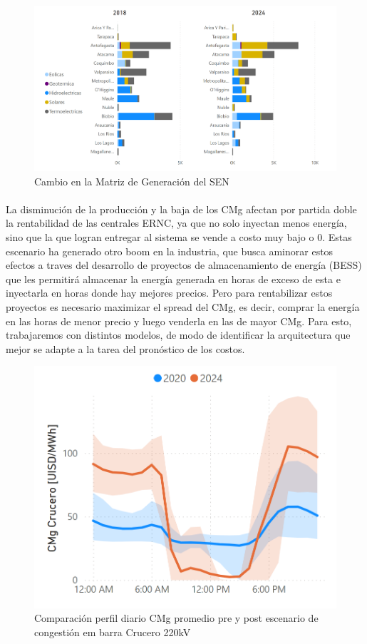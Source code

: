\documentclass[twocolumn]{article}
\begin{document}
\begin{figure}[htbp]
    \centering
    \includegraphics[width=1\columnwidth]{matriz_sist.png}
    \caption{Cambio en la Matriz de Generación del SEN}
    \label{fig:matriz_sistema}
\end{figure}

\paragraph{}
La disminución de la producción y la baja de los CMg afectan por partida doble la rentabilidad de las centrales ERNC, ya que
no solo inyectan menos energía, sino que la que logran entregar al sistema se vende a costo muy bajo o 0.
Estas escenario ha generado otro boom en la industria, que busca aminorar estos efectos a traves del desarrollo de 
proyectos de almacenamiento de energía (BESS) que les permitirá almacenar la energía generada en horas de exceso de esta 
e inyectarla en horas donde hay mejores precios. Pero para rentabilizar estos proyectos es necesario maximizar el spread
del CMg, es decir, comprar la energía en las horas de menor precio y luego venderla en las de mayor CMg. Para esto,
trabajaremos con distintos modelos, de modo de identificar la arquitectura que mejor se adapte a la tarea del pronóstico 
de los costos.

\begin{figure}[htbp]
    \centering
    \includegraphics[width=0.8\columnwidth]{cmg_comparacion.png}
    \caption{Comparación perfil diario CMg promedio pre y post escenario de congestión em barra
	Crucero 220kV}
    \label{fig:comp_cmg}
\end{figure}
\end{document}
